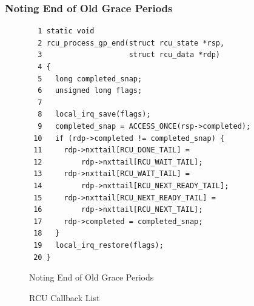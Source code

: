  \QuickQuizEnd

\subsubsection{Noting End of Old Grace Periods}
\label{app:rcuimpl:rcutreewt:Noting End of Old Grace Periods}

\begin{figure}[tbp]
{ \scriptsize
\begin{verbatim}
  1 static void
  2 rcu_process_gp_end(struct rcu_state *rsp,
  3                    struct rcu_data *rdp)
  4 {
  5   long completed_snap;
  6   unsigned long flags;
  7 
  8   local_irq_save(flags);
  9   completed_snap = ACCESS_ONCE(rsp->completed);
 10   if (rdp->completed != completed_snap) {
 11     rdp->nxttail[RCU_DONE_TAIL] =
 12         rdp->nxttail[RCU_WAIT_TAIL];
 13     rdp->nxttail[RCU_WAIT_TAIL] =
 14         rdp->nxttail[RCU_NEXT_READY_TAIL];
 15     rdp->nxttail[RCU_NEXT_READY_TAIL] =
 16         rdp->nxttail[RCU_NEXT_TAIL];
 17     rdp->completed = completed_snap;
 18   }
 19   local_irq_restore(flags);
 20 }
\end{verbatim}
}
\caption{Noting End of Old Grace Periods}
\label{fig:app:rcuimpl:rcutreewt:Noting End of Old Grace Periods}
\end{figure}

\begin{figure}[tb]
\begin{center}
\end{center}
\caption{RCU Callback List}
\label{fig:app:rcuimpl:rcutree:RCU Callback List}
\end{figure}

